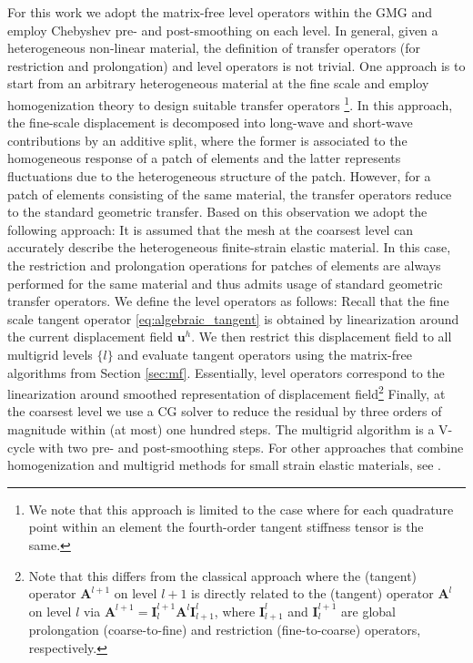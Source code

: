 \documentclass[preprint,12pt,times]{elsarticle}
\def\gz  #1{           \mbox{$\boldsymbol{#1}$}}
\begin{document}
For this work we adopt the matrix-free level operators within the GMG and employ Chebyshev pre- and post-smoothing on each level. In general, given a heterogeneous non-linear material, the definition of transfer operators (for restriction and prolongation) and level operators is not trivial. One approach is to start from an arbitrary heterogeneous material at the fine scale and employ homogenization theory \cite{Suquet1987, Hill1972,Hashin1983,Castaneda1997} to design suitable transfer operators \cite{Miehe2007}\footnote{
  We note that this approach is limited to the case where for each quadrature point within an element the fourth-order tangent {\color{red}stiffness tensor} is the same.
}.
In this approach, the fine-scale displacement is decomposed into long-wave and short-wave contributions by an additive split, where the former is associated to the homogeneous response of a patch of elements and the latter represents fluctuations due to the heterogeneous structure of the patch. However, for a patch of elements consisting of the same material, the transfer operators reduce to the standard geometric transfer. Based on this observation we adopt the following approach: It is assumed that the mesh at the coarsest level can accurately describe the heterogeneous finite-strain elastic material. In this case, the restriction and prolongation operations for patches of elements are always performed for the same material and thus admits usage of standard geometric transfer operators. We define the level operators as follows: Recall that the fine scale tangent {\color{red}operator} \eqref{eq:algebraic_tangent} is obtained by linearization around the current displacement field $\gz u^h$. We then restrict this displacement field to all multigrid levels $\{l\}$ and evaluate tangent operators using the matrix-free algorithms from Section \ref{sec:mf}. Essentially, level operators correspond to the linearization around smoothed representation of displacement field\footnote{
Note that this differs from the classical approach where the (tangent) operator $\gz A^{l+1}$ on level $l+1$ is directly related to the (tangent) operator $\gz A^{l}$ on level $l$ via $\gz A^{l+1}=\gz I^{l+1}_{l} \gz A^l \gz I^l_{l+1}$, where $\gz I^l_{l+1}$ and $\gz I^{l+1}_l$ are global prolongation (coarse-to-fine) and restriction (fine-to-coarse) operators, respectively.
}
Finally, at the coarsest level we use a CG solver to reduce the residual by three orders of magnitude within (at most) one hundred steps.
The multigrid algorithm is a V-cycle with two pre- and post-smoothing steps. For other approaches that combine homogenization and multigrid methods for small strain elastic materials, see \cite{Bayreuther2003,Fish1995}.
\end{document}
